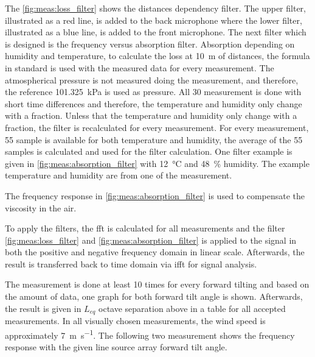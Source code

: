 
The \autoref{fig:meas:loss_filter} shows the distances dependency filter. The upper filter, illustrated as a red line, is added to the back microphone where the lower filter, illustrated as a blue line, is added to the front microphone. The next filter which is designed is the frequency versus absorption filter. 
Absorption depending on humidity and temperature, to calculate the loss at \SI{10}{\meter} of distances, the formula in standard \citep{iso_9613-1} is used with the measured data for every measurement. The atmospherical pressure is not measured doing the measurement, and therefore, the reference \SI{101.325}{\kilo\pascal} is used as pressure. All 30 measurement is done with short time differences and therefore, the temperature and humidity only change with a fraction. Unless that the temperature and humidity only change with a fraction, the filter is recalculated for every measurement. For every measurement, 55 sample is available for both temperature and humidity, the average of the 55 samples is calculated and used for the filter calculation. One filter example is given in \autoref{fig:meas:absorption_filter} with \SI{12}{\celsius} and \SI{48}{\percent} humidity. The example temperature and humidity are from one of the measurement.

  
 
The frequency response in \autoref{fig:meas:absorption_filter} is used to compensate the viscosity in the air. 

To apply the filters, the \gls{fft} is calculated for all measurements and the filter  \autoref{fig:meas:loss_filter} and \autoref{fig:meas:absorption_filter} is applied to the signal in both the positive and negative frequency domain in linear scale. Afterwards, the result is transferred back to time domain via \gls{ifft} for signal analysis.  

The measurement is done at least 10 times for every forward tilting and based on the amount of data, one graph for both forward tilt angle is shown. Afterwards, the result is given in $L_{eq}$ octave separation above  in a table for all accepted measurements. In all visually chosen measurements, the wind speed is approximately \SI{7}{\meter\per\second}. The following two measurement shows the frequency response with the given line source array forward tilt angle. 
   
